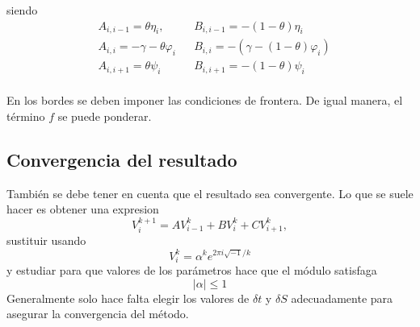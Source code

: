 siendo
\begin{align*}
    &A_{i,i-1} = \theta\eta_{i}, && B_{i,i-1} = -(1-\theta)\eta_{i} \\
    &A_{i,i} = -\gamma - \theta \varphi_i && B_{i,i} = -(\gamma - (1-\theta) \varphi_i)\\
    &A_{i,i+1} = \theta\psi_{i} && B_{i,i+1} = -(1-\theta)\psi_{i} \\
\end{align*}




En los bordes se deben imponer las condiciones de frontera. De igual manera, el término $f$ se puede ponderar.








\subsection{Convergencia del resultado}
También se debe tener en cuenta que el resultado sea convergente. Lo que se suele hacer es obtener una expresion
\begin{equation*}
    V_i^{k+1} = A V_{i-1}^k + B V_i^k + C V_{i+1}^k,
\end{equation*}
sustituir usando
\begin{equation*}
    \boxed{V_i^k = \alpha^k e^{2\pi i \sqrt{-1}/k}}
\end{equation*}
y estudiar para que valores de los parámetros hace que el módulo satisfaga
\begin{equation*}
    \boxed{|\alpha| \leq 1}
\end{equation*}
Generalmente solo hace falta elegir los valores de $\delta t$ y $\delta S$ adecuadamente para asegurar la convergencia del método.








